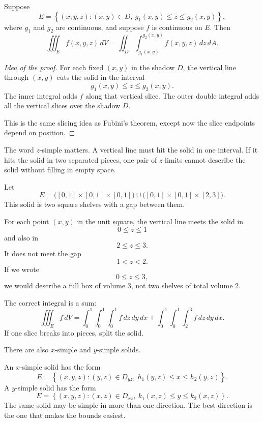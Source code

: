 \begin{theorem}
Suppose
\[
    E=
    \left\{
    (x,y,z):
    (x,y)\in D,\ 
    g_1(x,y)\le z\le g_2(x,y)
    \right\},
\]
where \(g_1\) and \(g_2\) are continuous, and suppose \(f\) is continuous on \(E\).
Then
\[
\boxed{
    \iiint_E f(x,y,z)\,dV
    =
    \iint_D
    \int_{g_1(x,y)}^{g_2(x,y)}
    f(x,y,z)\,dz\,dA.
}
\]
\end{theorem}

\begin{proof}[Idea of the proof]
For each fixed \((x,y)\) in the shadow \(D\), the vertical line through \((x,y)\) cuts
the solid in the interval
\[
    g_1(x,y)\le z\le g_2(x,y).
\]
The inner integral adds \(f\) along that vertical slice.  The outer double integral adds
all the vertical slices over the shadow \(D\).

This is the same slicing idea as Fubini's theorem, except now the slice endpoints depend
on position.
\end{proof}

The word \(z\)-simple matters.  A vertical line must hit the solid in one interval.  If it
hits the solid in two separated pieces, one pair of \(z\)-limits cannot describe the solid
without filling in empty space.

\begin{example}
Let
\[
    E=
    \bigl([0,1]\times[0,1]\times[0,1]\bigr)
    \cup
    \bigl([0,1]\times[0,1]\times[2,3]\bigr).
\]
This solid is two square shelves with a gap between them.

For each point \((x,y)\) in the unit square, the vertical line meets the solid in
\[
    0\le z\le1
\]
and also in
\[
    2\le z\le3.
\]
It does not meet the gap
\[
    1<z<2.
\]
If we wrote
\[
    0\le z\le3,
\]
we would describe a full box of volume \(3\), not two shelves of total volume \(2\).

The correct integral is a sum:
\[
\boxed{
\iiint_E f\,dV
=
\int_0^1\int_0^1\int_0^1 f\,dz\,dy\,dx
+
\int_0^1\int_0^1\int_2^3 f\,dz\,dy\,dx.
}
\]
If one slice breaks into pieces, split the solid.
\end{example}

There are also \(x\)-simple and \(y\)-simple solids.

An \(x\)-simple solid has the form
\[
    E=
    \left\{
    (x,y,z):
    (y,z)\in D_{yz},\
    h_1(y,z)\le x\le h_2(y,z)
    \right\}.
\]
A \(y\)-simple solid has the form
\[
    E=
    \left\{
    (x,y,z):
    (x,z)\in D_{xz},\
    k_1(x,z)\le y\le k_2(x,z)
    \right\}.
\]
The same solid may be simple in more than one direction.  The best direction is the one
that makes the bounds easiest.

